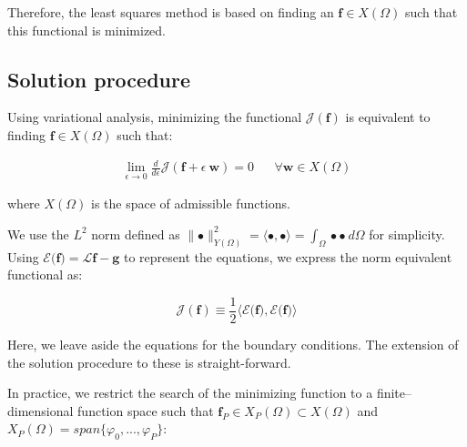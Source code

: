 \documentclass{CFD2011}
\begin{document}
Therefore, the least squares method is based on finding an $\mathbf{f} \in X(\Omega)$ such that this functional is minimized. 
%
%
%

\subsection{Solution procedure}
Using variational analysis, minimizing the functional $\mathcal{J}(\mathbf{f})$ is equivalent to finding $\mathbf{f} \in X(\Omega)$ such that:

\begin{eqnarray}
\lim_{\epsilon \to 0} \frac{d}{d\epsilon}{\mathcal{J}(\mathbf{f}+\epsilon \ \mathbf{w})}=0 && \forall \mathbf{w} \in X(\Omega)
\label{eq:minimization}
\end{eqnarray}

\noindent where $X(\Omega)$ is the space of admissible functions.

We use the $L^2$ norm defined as $\parallel \bullet  \parallel_{Y(\Omega)}^2= \langle \bullet, \bullet \rangle= \int_\Omega  \bullet \bullet   \ d\Omega$ for simplicity. Using $\mathcal{E} {(}\mathbf{f} {)}=\mathcal{L}\mathbf{f}-\mathbf{g}$ to represent the equations, we express the norm equivalent functional as:

\begin{equation}
\mathcal{J}(\mathbf{f})\equiv  \frac{1}{2} \langle \mathcal{E} {(}\mathbf{f} {)},\mathcal{E} {(}\mathbf{f} {)} \rangle
\end{equation}

Here, we leave aside the equations for the boundary conditions. The extension of the solution procedure to these is straight-forward. 

In practice, we restrict the search of the minimizing function to a finite--dimensional function space such that $\mathbf{f}_P \in X_P(\Omega) \subset X(\Omega)$ and $X_P(\Omega)= span\{ \varphi_0,...,\varphi_P \} $:
\end{document}
